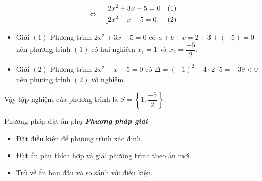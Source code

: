 \begin{vd}
{\begin{enumerate}
\begin{eqnarray}
	&\Leftrightarrow& \left[\begin{aligned}&2x^2+3x-5=0 &(1)\\ &2x^2-x+5=0. &(2)\end{aligned}\right.\notag
	\end{eqnarray}
	\begin{itemize}
		\item Giải $(1)$ Phương trình $2x^2+3x-5=0$ có $a+b+c=2+3+(-5)=0$ nên phương trình $(1)$ có hai nghiệm $x_1=1$ và $x_2=\dfrac{-5}{2}$.
		\item Giải $(2)$ Phương trình $2x^2-x+5=0$ có $\Delta=(-1)^2-4\cdot 2\cdot 5=-39<0$ nên phương trình $(2)$ vô nghiệm.
	\end{itemize}
Vậy tập nghiệm của phương trình là $S=\left\lbrace 1;\dfrac{-5}{2}\right\rbrace$.
\end{enumerate}
}
\end{vd}

\begin{dang}{Phương pháp đặt ẩn phụ}
	\textbf{\textit{Phương pháp giải}}
	\begin{itemize}
		\item Đặt điều kiện để phương trình xác định.
		\item Đặt ẩn phụ thích hợp và giải phương trình theo ẩn mới.
		\item Trở về ẩn ban đầu và so sánh với điều kiện.
	\end{itemize}
\end{dang}


